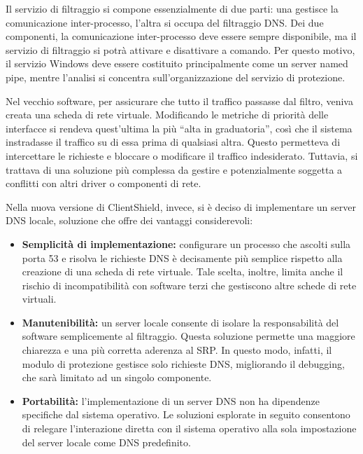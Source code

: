 \documentclass[12pt,a4paper,openright,twoside]{book}
\begin{document}
Il servizio di filtraggio si compone essenzialmente di due parti: una gestisce la comunicazione inter-processo, l'altra si occupa del filtraggio \gls{DNS}.
Dei due componenti, la comunicazione inter-processo deve essere sempre disponibile, ma il servizio di filtraggio si potrà attivare e disattivare a comando.
Per questo motivo, il servizio Windows deve essere costituito principalmente come un server named pipe, mentre l'analisi si concentra sull'organizzazione del servizio di protezione.

Nel vecchio software, per assicurare che tutto il traffico passasse dal filtro, veniva creata una scheda di rete virtuale.
Modificando le metriche di priorità delle interfacce si rendeva quest’ultima la più “alta in graduatoria”, così che il sistema instradasse il traffico su di essa prima di qualsiasi altra. Questo permetteva di intercettare le richieste e bloccare o modificare il traffico indesiderato. Tuttavia, si trattava di una soluzione più complessa da gestire e potenzialmente soggetta a conflitti con altri driver o componenti di rete.

Nella nuova versione di ClientShield, invece, si è deciso di implementare un server \gls{DNS} locale, soluzione che offre dei vantaggi considerevoli:

\begin{itemize}
	\item \textbf{Semplicità di implementazione:}
	configurare un processo che ascolti sulla porta 53 e risolva le richieste \gls{DNS} è decisamente più semplice rispetto alla creazione di una scheda di rete virtuale.
	Tale scelta, inoltre, limita anche il rischio di incompatibilità con software terzi che gestiscono altre schede di rete virtuali.
	
	\item \textbf{Manutenibilità:}
	un server locale consente di isolare la responsabilità del software semplicemente al filtraggio.
	Questa soluzione permette una maggiore chiarezza e una più corretta aderenza al \gls{SRP}. %
	In questo modo, infatti, il modulo di protezione gestisce solo richieste \gls{DNS}, migliorando il debugging, che sarà limitato ad un singolo componente.
	
	\item \textbf{Portabilità:}
	l'implementazione di un server \gls{DNS} non ha dipendenze specifiche dal sistema operativo.
	Le soluzioni esplorate in seguito consentono di relegare l'interazione diretta con il sistema operativo alla sola impostazione del server locale come \gls{DNS} predefinito.
\end{itemize}
\end{document}
